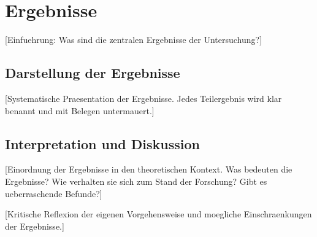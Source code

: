\chapter{Ergebnisse}
\label{chap:ergebnisse}


[Einfuehrung: Was sind die zentralen Ergebnisse der Untersuchung?]


\section{Darstellung der Ergebnisse}
\label{sec:darstellung}

[Systematische Praesentation der Ergebnisse. Jedes Teilergebnis
wird klar benannt und mit Belegen untermauert.]


\section{Interpretation und Diskussion}
\label{sec:diskussion}

[Einordnung der Ergebnisse in den theoretischen Kontext.
Was bedeuten die Ergebnisse? Wie verhalten sie sich zum
Stand der Forschung? Gibt es ueberraschende Befunde?]

[Kritische Reflexion der eigenen Vorgehensweise und moegliche
Einschraenkungen der Ergebnisse.]
